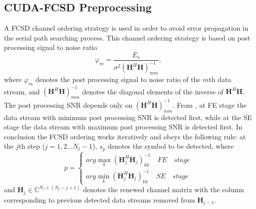 \documentclass[letterpaper, 10pt, conference,twoside]{ieeeconf}
\begin{document}
\subsection{CUDA-FCSD Preprocessing}
A FCSD channel ordering strategy is used in order to avoid error propagation in the serial path searching process. This channel ordering strategy is based on post processing signal to noise ratio\cite{wolniansky1998v}
\begin{equation}
\varphi_{m}=\frac{E_{s}}{\sigma^{2}(\mathbf{H}^{H}\mathbf{H})_{mm}^{-1}},  \label{ppsnr}
\end{equation}
where $\varphi_{m}$ denotes the post processing signal to noise ratio of the $m$th data stream, and $(\mathbf{H}^{H}\mathbf{H})_{mm}^{-1}$ denotes the diagonal elements of the inverse of $\mathbf{H}^{H}\mathbf{H}$. The post processing SNR depends only on $(\mathbf{H}^{H}\mathbf{H})_{mm}^{-1}$. From \cite{barbero2008fixing}, at FE stage the data stream with minimum post processing SNR is detected first, while at the SE stage the data stream with maximum post processing SNR is detected first. In conclusion the FCSD ordering works iteratively and obeys the following rule:
at the $j$th step ($j=1,2\dots N_{t}-1$), $s_{p}$ denotes the symbol to be detected, where 
\begin{equation}
p=\left\lbrace \begin{array}{c}
arg\max_{k}(\mathbf{H}_{j}^{H}\mathbf{H}_{j})_{kk}^{-1}\quad FE\quad stage\\
arg\min_{k}(\mathbf{H}_{j}^{H}\mathbf{H}_{j})_{kk}^{-1}\quad SE\quad stage   \label{the ordering}
\end{array}\right.  
\end{equation}  
and $\mathbf{H}_{j}\in \mathbb{C}^{N_{r}\times (N_{t}-j+1)}$ denotes the renewed channel matrix with the column corresponding to previous detected data streams removed from $\mathbf{H}_{j-1}$.
\end{document}
